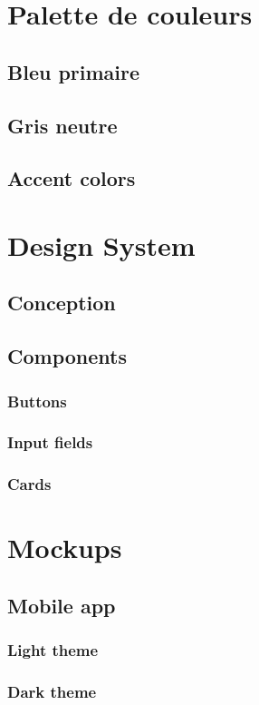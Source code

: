 \section{Palette de couleurs}
\subsection{Bleu primaire}
\subsection{Gris neutre}
\subsection{Accent colors}

\section{Design System}
\subsection{Conception}
\subsection{Components}
\subsubsection{Buttons}
\subsubsection{Input fields}
\subsubsection{Cards}

\section{Mockups}
\subsection{Mobile app}
\subsubsection{Light theme}
\subsubsection{Dark theme}
